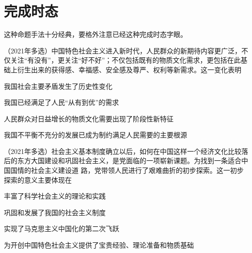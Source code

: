 \documentclass[lang=cn,newtx,10pt,scheme=chinese,pad,twocol]{zznote}
\begin{document}
\section{完成时态}
\begin{definition}
	这种命题手法十分经典，要格外注意{\color{red}已经}这种完成时态字眼。
\end{definition}

\begin{example} （2021年多选）中国特色社会主义进入新时代，人民群众的新期待内容更广泛，不仅关注“有没有”，更关注“好不好”；不仅包括既有的物质文化需求，更包括在此基础上衍生出来的获得感、幸福感、安全感及尊严、权利等新需求。这一变化表明
	\begin{choice}
		\item 我国社会主要矛盾发生了历史性变化
		\item 我国已经满足了人民“从有到优”的需求
		\item 人民群众对日益增长的物质文化需要出现了阶段性新特征
		\item 我国不平衡不充分的发展已成为制约满足人民需要的主要根源
	\end{choice}
\end{example}

\begin{example}
	（2021年多选）社会主义基本制度确立以后，如何在中国这样一个经济文化比较落后的东方大国建设和巩固社会主义，是党面临的一项崭新课题。为找到一条适合中国国情的社会主义建设道  路，党带领人民进行了艰难曲折的初步探索。这一初步探索的意义主要体现在
	\begin{choice}
		\item 丰富了科学社会主义的理论和实践
		\item 巩固和发展了我国的社会主义制度
		\item 实现了马克思主义中国化的第二次飞跃
		\item 为开创中国特色社会主义提供了宝贵经验、理论准备和物质基础
	\end{choice}
\end{example}
\end{document}
